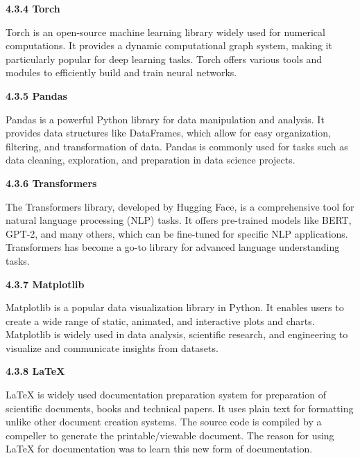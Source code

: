 \documentclass[a4paper,12pt]{article}
\begin{document}
{{{\begin{flushleft}
			\fontsize{13}{15}\selectfont\textbf{4.3.4 Torch}
			\label{torch}
		\end{flushleft}
 Torch is an open-source machine learning library widely used for numerical computations. It provides a dynamic computational graph system, making it particularly popular for deep learning tasks. Torch offers various tools and modules to efficiently build and train neural networks.

\begin{flushleft}
			\fontsize{13}{15}\selectfont\textbf{4.3.5 Pandas}
			\label{pandas}
		\end{flushleft}
 Pandas is a powerful Python library for data manipulation and analysis. It provides data structures like DataFrames, which allow for easy organization, filtering, and transformation of data. Pandas is commonly used for tasks such as data cleaning, exploration, and preparation in data science projects.


\begin{flushleft}
			\fontsize{13}{15}\selectfont\textbf{4.3.6 Transformers}
			\label{transform}
		\end{flushleft}
The Transformers library, developed by Hugging Face, is a comprehensive tool for natural language processing (NLP) tasks. It offers pre-trained models like BERT, GPT-2, and many others, which can be fine-tuned for specific NLP applications. Transformers has become a go-to library for advanced language understanding tasks.




\begin{flushleft}
			\fontsize{13}{15}\selectfont\textbf{4.3.7 Matplotlib}
			\label{mat}
		\end{flushleft}
 Matplotlib is a popular data visualization library in Python. It enables users to create a wide range of static, animated, and interactive plots and charts. Matplotlib is widely used in data analysis, scientific research, and engineering to visualize and communicate insights from datasets.

 \begin{flushleft}
			\fontsize{13}{15}\selectfont\textbf{4.3.8 LaTeX}
			\label{latex}
		\end{flushleft}
 LaTeX is widely used documentation preparation system for preparation of scientific documents, books and technical papers. It uses plain text for formatting unlike other document creation systems. The source code is compiled by a compeller to generate the printable/viewable document. The reason for using LaTeX for documentation was to learn this new form of documentation.

}}}
\end{document}
